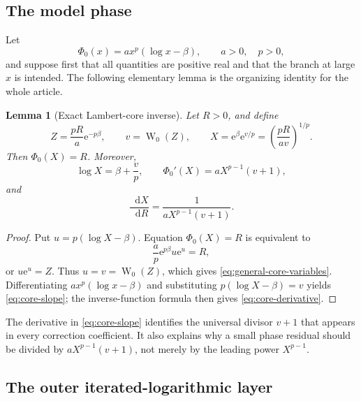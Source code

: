 \documentclass[11pt,oneside]{article}
\theoremstyle{plain}
\newtheorem{lemma}[theorem]{Lemma}
\theoremstyle{definition}
\theoremstyle{remark}
\newcommand{\W}{\operatorname{W}}
\newcommand{\e}{\mathrm{e}}
\newcommand{\dd}{\mathop{}\!\mathrm{d}}
\begin{document}
\subsection{The model phase}

Let
\begin{equation}
 \Phi_0(x)=a x^p(\log x-\beta),
 \qquad a>0,\quad p>0,
 \label{eq:general-core}
\end{equation}
and suppose first that all quantities are positive real and that the branch at
large \(x\) is intended.  The following elementary lemma is the organizing
identity for the whole article.

\begin{lemma}[Exact Lambert-core inverse]
\label{lem:core-inverse}
Let \(R>0\), and define
\begin{equation}
 Z=\frac{pR}{a}\e^{-p\beta},\qquad
 v=\W_0(Z),\qquad
 X=\e^\beta\e^{v/p}
   =\left(\frac{pR}{av}\right)^{1/p}.
 \label{eq:general-core-variables}
\end{equation}
Then \(\Phi_0(X)=R\).  Moreover,
\begin{equation}
 \log X=\beta+\frac{v}{p},\qquad
 \Phi_0'(X)=aX^{p-1}(v+1),
 \label{eq:core-slope}
\end{equation}
and
\begin{equation}
 \frac{\dd X}{\dd R}=\frac{1}{aX^{p-1}(v+1)}.
 \label{eq:core-derivative}
\end{equation}
\end{lemma}

\begin{proof}
Put \(u=p(\log X-\beta)\).  Equation \(\Phi_0(X)=R\) is equivalent to
\[
 \frac{a}{p}\e^{p\beta}u\e^u=R,
\]
or \(u\e^u=Z\).  Thus \(u=v=\W_0(Z)\), which gives
\cref{eq:general-core-variables}.  Differentiating
\(a x^p(\log x-\beta)\) and substituting
\(p(\log X-\beta)=v\) yields \cref{eq:core-slope}; the inverse-function
formula then gives \cref{eq:core-derivative}.
\end{proof}

The derivative in \cref{eq:core-slope} identifies the universal divisor
\(v+1\) that appears in every correction coefficient.  It also explains why a
small phase residual should be divided by \(aX^{p-1}(v+1)\), not merely by the
leading power \(X^{p-1}\).

\subsection{The outer iterated-logarithmic layer}
\end{document}
